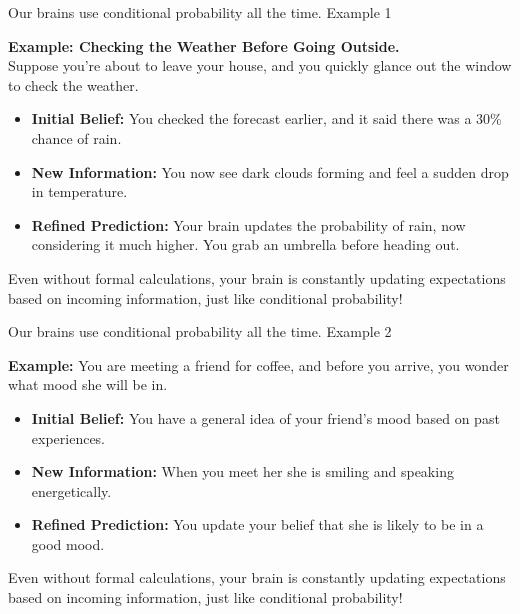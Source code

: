 \documentclass[aspectratio=169]{beamer}
\begin{document}
\begin{frame}{Our brains use conditional probability all the time. Example 1}
    
    \textbf{Example: Checking the Weather Before Going Outside.} \\
    Suppose you’re about to leave your house, and you quickly glance out the window to check the weather.
    \vspace{0.3cm}
    
    \begin{itemize}
        \item \textbf{Initial Belief:} You checked the forecast earlier, and it said there was a 30\% chance of rain.
        \item \textbf{New Information:} You now see dark clouds forming and feel a sudden drop in temperature.
        \item \textbf{Refined Prediction:} Your brain updates the probability of rain, now considering it much higher. You grab an umbrella before heading out.
    \end{itemize}
    \vspace{0.3cm}
    
    Even without formal calculations, your brain is constantly updating expectations based on incoming information, just like conditional probability!
\end{frame}

\begin{frame}{Our brains use conditional probability all the time. Example 2}
    
    \textbf{Example:} You are meeting a friend for coffee, and before you arrive, you wonder what mood she will be in.
    \vspace{0.3cm}
    
    \begin{itemize}
        \item \textbf{Initial Belief:} You have a general idea of your friend's mood based on past experiences.
        \item \textbf{New Information:} When you meet her she is smiling and speaking energetically.
        \item \textbf{Refined Prediction:} You update your belief that she is likely to be in a good mood.
    \end{itemize}
    \vspace{0.3cm}
    
    Even without formal calculations, your brain is constantly updating expectations based on incoming information, just like conditional probability!
\end{frame}
\end{document}
